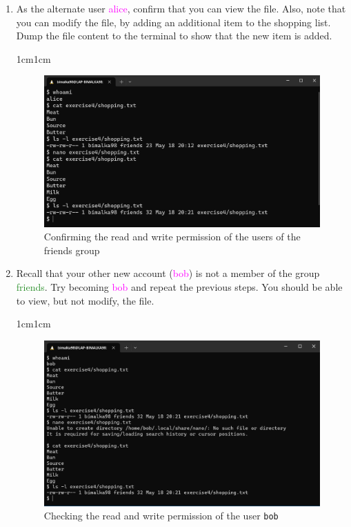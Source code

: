 \documentclass[11pt,letterpaper]{article}
\newenvironment{answer}{\em \color{blue} \begin{adjustwidth}{1cm}{1cm}}{\end{adjustwidth}}
\begin{document}
\begin{enumerate}
		\item As the alternate user \textcolor{magenta}{alice}, confirm that you can view the file. Also, note that you can modify the file, by adding an additional item to the shopping list. Dump the file content to the terminal to show that the new item is added.
		
		\begin{answer}
			\begin{figure}[H]
				\centering
				\includegraphics[width=0.65\columnwidth]{images/q11_1}
				\caption{Confirming the read and write permission of the users of the friends group} \label{fig:q11_1}
			\end{figure}
		\end{answer}
		\pagebreak
		\item Recall that your other new account (\textcolor{magenta}{bob}) is not a member of the group \textcolor{ForestGreen}{friends}. Try becoming \textcolor{magenta}{bob} and repeat the previous steps. You should be able to view, but not modify, the file.
		
		\begin{answer}
		\begin{figure}[H]
			\centering
			\includegraphics[width=0.65\columnwidth]{images/q12_1}
			\caption{Checking the read and write permission of the user {\tt bob}} \label{fig:q12_1}
		\end{figure}
	

\end{answer}
\end{enumerate}
\end{document}
